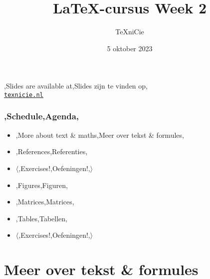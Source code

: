 \documentclass[
    dutch,
    everyoneauthor=true,
    defaultSlideCollection=vincent,
]{../../cursuspresentatie}
\title[\LaTeX{}-cursus Week 2]{\LaTeX{}-cursus Week 2}
\author{\TeX niCie}
\date{5 oktober 2023}
\let\placetarget\relax
\begin{document}

\begin{frame}
    \titlepage
    \centering

    {\Large\lang,Slides are available at,Slides zijn te vinden op,\\
    \href{https://texnicie.nl}{\ul{\texttt{texnicie.nl}}}}
\end{frame}

\setul{1pt}{2pt}

\begin{frame}
    \frametitle{\lang,Schedule,Agenda,}
    
    \begin{itemize}[label=\textbullet]
        \item \lang,More about text \& maths,Meer over tekst \& formules,
        \item \lang,References,Referenties,
        \item $ \langle $\lang,Exercises!,Oefeningen!,$ \rangle $
        \item \lang,Figures,Figuren,
        \item \lang,Matrices,Matrices,
        \item \lang,Tables,Tabellen,
        \item $ \langle $\lang,Exercises!,Oefeningen!,$ \rangle $
    \end{itemize}
\end{frame}

\section{Meer over tekst \& formules}\label{sec:basics}

\def\placetarget{\hypertarget{basics}{}}

    
\end{document}
